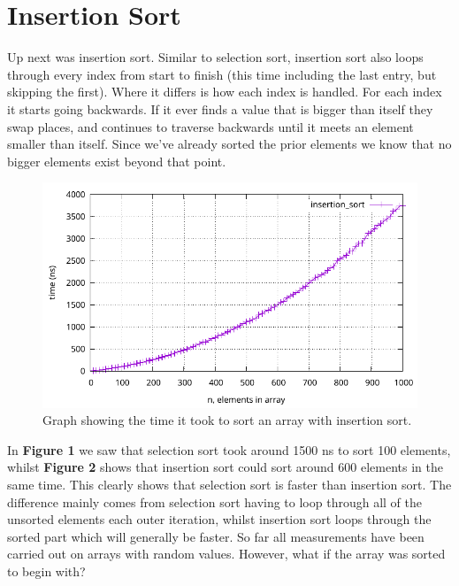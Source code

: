 \documentclass[a4paper, 11pt]{article}
\begin{document}
\section{Insertion Sort}
	Up next was insertion sort.
	Similar to selection sort, insertion sort also loops through every index from start to finish (this time including the last entry, but skipping the first).
	Where it differs is how each index is handled.
	For each index it starts going backwards.
	If it ever finds a value that is bigger than itself they swap places, and continues to traverse backwards until it meets an element smaller than itself.
	Since we've already sorted the prior elements we know that no bigger elements exist beyond that point.
	\begin{figure}[H]
		\centering
		\includegraphics[scale=0.7]{graphs/insertion_sort.pdf}
		\caption{
			Graph showing the time it took to sort an array with insertion sort.
		}
	\end{figure}
	In \textbf{Figure 1} we saw that selection sort took around 1500 ns to sort 100 elements,
	whilst \textbf{Figure 2} shows that insertion sort could sort around 600 elements in the same time.
	This clearly shows that selection sort is faster than insertion sort.
	The difference mainly comes from selection sort having to loop through all of the unsorted elements each outer iteration,
	whilst insertion sort loops through the sorted part which will generally be faster.
	So far all measurements have been carried out on arrays with random values.
	However, what if the array was sorted to begin with?
\end{document}

